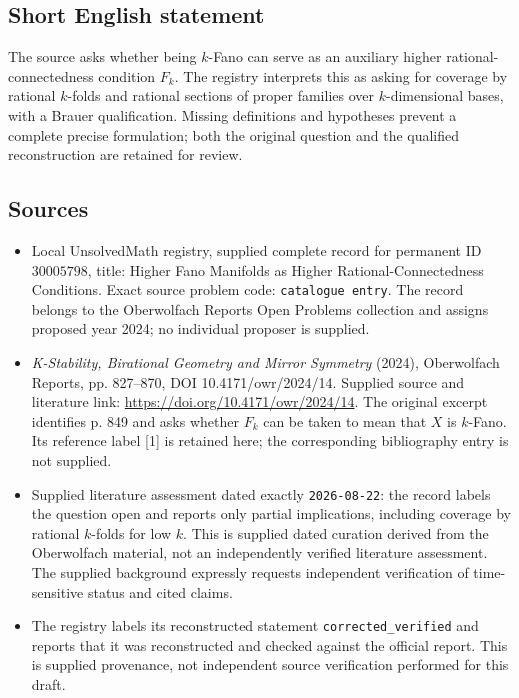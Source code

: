 \documentclass[11pt]{article}
\begin{document}
\subsection{Short English statement}
The source asks whether being \(k\)-Fano can serve as an auxiliary higher rational-connectedness condition \(F_k\). The registry interprets this as asking for coverage by rational \(k\)-folds and rational sections of proper families over \(k\)-dimensional bases, with a Brauer qualification. Missing definitions and hypotheses prevent a complete precise formulation; both the original question and the qualified reconstruction are retained for review.
\subsection{Sources}
\begin{itemize}
\item Local UnsolvedMath registry, supplied complete record for permanent ID \(30005798\), title: Higher Fano Manifolds as Higher Rational-Connectedness Conditions. Exact source problem code: \texttt{catalogue entry}. The record belongs to the Oberwolfach Reports Open Problems collection and assigns proposed year 2024; no individual proposer is supplied.
\item \emph{K-Stability, Birational Geometry and Mirror Symmetry} (2024), Oberwolfach Reports, pp. 827--870, DOI 10.4171/owr/2024/14. Supplied source and literature link: \url{https://doi.org/10.4171/owr/2024/14}. The original excerpt identifies p. 849 and asks whether \(F_k\) can be taken to mean that \(X\) is \(k\)-Fano. Its reference label [1] is retained here; the corresponding bibliography entry is not supplied.
\item Supplied literature assessment dated exactly \texttt{2026-08-22}: the record labels the question open and reports only partial implications, including coverage by rational \(k\)-folds for low \(k\). This is supplied dated curation derived from the Oberwolfach material, not an independently verified literature assessment. The supplied background expressly requests independent verification of time-sensitive status and cited claims.
\item The registry labels its reconstructed statement \texttt{corrected\_verified} and reports that it was reconstructed and checked against the official report. This is supplied provenance, not independent source verification performed for this draft.
\end{itemize}
\end{document}
